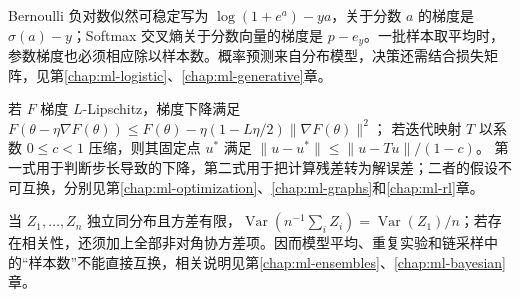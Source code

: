 Bernoulli 负对数似然可稳定写为 $\log(1+e^a)-ya$，关于分数 $a$ 的梯度是 $\sigma(a)-y$；Softmax 交叉熵关于分数向量的梯度是 $p-e_y$。一批样本取平均时，参数梯度也必须相应除以样本数。概率预测来自分布模型，决策还需结合损失矩阵，见第\ref{chap:ml-logistic}、\ref{chap:ml-generative}章。

若 $F$ 梯度 $L$-Lipschitz，梯度下降满足
$F(\theta-\eta\nabla F(\theta))\leq F(\theta)-\eta(1-L\eta/2)\|\nabla F(\theta)\|^2$；
若迭代映射 $T$ 以系数 $0\leq c<1$ 压缩，则其固定点 $u^*$ 满足
$\|u-u^*\|\leq\|u-Tu\|/(1-c)$。
第一式用于判断步长导致的下降，第二式用于把计算残差转为解误差；二者的假设不可互换，分别见第\ref{chap:ml-optimization}、\ref{chap:ml-graphs}和\ref{chap:ml-rl}章。

当 $Z_1,\ldots,Z_n$ 独立同分布且方差有限，$\operatorname{Var}(n^{-1}\sum_iZ_i)=\operatorname{Var}(Z_1)/n$；若存在相关性，还须加上全部非对角协方差项。因而模型平均、重复实验和链采样中的“样本数”不能直接互换，相关说明见第\ref{chap:ml-ensembles}、\ref{chap:ml-bayesian}章。





